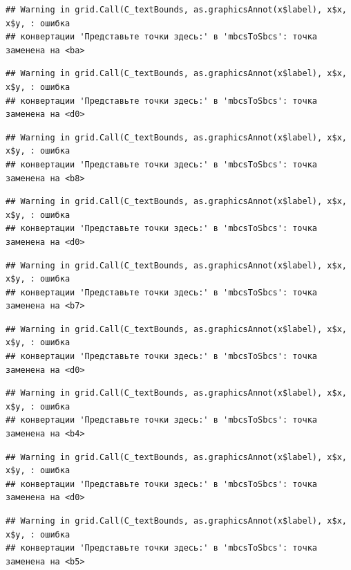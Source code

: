 \documentclass[]{book}
\begin{document}
\begin{verbatim}
## Warning in grid.Call(C_textBounds, as.graphicsAnnot(x$label), x$x, x$y, : ошибка
## конвертации 'Представьте точки здесь:' в 'mbcsToSbcs': точка заменена на <ba>
\end{verbatim}

\begin{verbatim}
## Warning in grid.Call(C_textBounds, as.graphicsAnnot(x$label), x$x, x$y, : ошибка
## конвертации 'Представьте точки здесь:' в 'mbcsToSbcs': точка заменена на <d0>
\end{verbatim}

\begin{verbatim}
## Warning in grid.Call(C_textBounds, as.graphicsAnnot(x$label), x$x, x$y, : ошибка
## конвертации 'Представьте точки здесь:' в 'mbcsToSbcs': точка заменена на <b8>
\end{verbatim}

\begin{verbatim}
## Warning in grid.Call(C_textBounds, as.graphicsAnnot(x$label), x$x, x$y, : ошибка
## конвертации 'Представьте точки здесь:' в 'mbcsToSbcs': точка заменена на <d0>
\end{verbatim}

\begin{verbatim}
## Warning in grid.Call(C_textBounds, as.graphicsAnnot(x$label), x$x, x$y, : ошибка
## конвертации 'Представьте точки здесь:' в 'mbcsToSbcs': точка заменена на <b7>
\end{verbatim}

\begin{verbatim}
## Warning in grid.Call(C_textBounds, as.graphicsAnnot(x$label), x$x, x$y, : ошибка
## конвертации 'Представьте точки здесь:' в 'mbcsToSbcs': точка заменена на <d0>
\end{verbatim}

\begin{verbatim}
## Warning in grid.Call(C_textBounds, as.graphicsAnnot(x$label), x$x, x$y, : ошибка
## конвертации 'Представьте точки здесь:' в 'mbcsToSbcs': точка заменена на <b4>
\end{verbatim}

\begin{verbatim}
## Warning in grid.Call(C_textBounds, as.graphicsAnnot(x$label), x$x, x$y, : ошибка
## конвертации 'Представьте точки здесь:' в 'mbcsToSbcs': точка заменена на <d0>
\end{verbatim}

\begin{verbatim}
## Warning in grid.Call(C_textBounds, as.graphicsAnnot(x$label), x$x, x$y, : ошибка
## конвертации 'Представьте точки здесь:' в 'mbcsToSbcs': точка заменена на <b5>
\end{verbatim}
\end{document}
